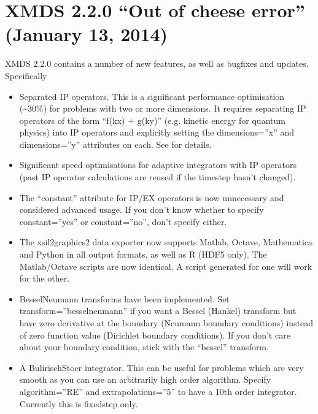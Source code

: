 \documentclass[letterpaper,10pt,english]{sphinxmanual}
\begin{document}
\section{XMDS 2.2.0 “Out of cheese error” (January 13, 2014)}
\label{\detokenize{news:xmds-2-2-0-out-of-cheese-error-january-13-2014}}
\sphinxAtStartPar
XMDS 2.2.0 contains a number of new features, as well as bugfixes and updates. Specifically
\begin{itemize}
\item {} 
\sphinxAtStartPar
Separated IP operators.  This is a significant performance optimisation (\textasciitilde{}30\%) for problems with two or more dimensions.  It requires separating IP operators of the form “f(kx) + g(ky)” (e.g. kinetic energy for quantum physics) into  IP operators and explicitly setting the dimensions=”x” and dimensions=”y” attributes on each.  See {\hyperref[\detokenize{optimisation_hints:optimisationhints}]{}} for details.

\item {} 
\sphinxAtStartPar
Significant speed optimisations for adaptive integrators with IP operators (past IP operator calculations are re\sphinxhyphen{}used if the time\sphinxhyphen{}step hasn’t changed).

\item {} 
\sphinxAtStartPar
The “constant” attribute for IP/EX operators is now unnecessary and considered advanced usage.  If you don’t know whether to specify constant=”yes” or constant=”no”, don’t specify either.

\item {} 
\sphinxAtStartPar
The xsil2graphics2 data exporter now supports Matlab, Octave, Mathematica and Python in all output formats, as well as R (HDF5 only).  The Matlab/Octave scripts are now identical.  A script generated for one will work for the other.

\item {} 
\sphinxAtStartPar
Bessel\sphinxhyphen{}Neumann transforms have been implemented.  Set transform=”bessel\sphinxhyphen{}neumann” if you want a Bessel (Hankel) transform but have zero derivative at the boundary (Neumann boundary conditions) instead of zero function value (Dirichlet boundary conditions).  If you don’t care about your boundary condition, stick with the “bessel” transform.

\item {} 
\sphinxAtStartPar
A Bulirisch\sphinxhyphen{}Stoer integrator.  This can be useful for problems which are very smooth as you can use an arbitrarily high order algorithm.  Specify algorithm=”RE” and extrapolations=”5” to have a 10th order integrator.  Currently this is fixed\sphinxhyphen{}step only.


\end{itemize}
\end{document}
